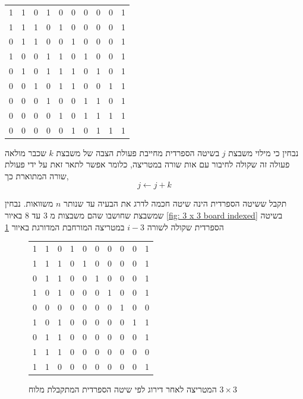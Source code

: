 \documentclass[12pt,twoside]{article}
\begin{document}
\begin{center}
    \begin{tabular}{|ccccccccc|c|}
        \hline
        1& 1& 0& 1& 0& 0& 0& 0& 0& 1 \\
        1& 1& 1& 0& 1& 0& 0& 0& 0& 1 \\
        0& 1& 1& 0& 0& 1& 0& 0& 0& 1 \\
        1& 0& 0& 1& 1& 0& 1& 0& 0& 1 \\
        0& 1& 0& 1& 1& 1& 0& 1& 0& 1 \\
        0& 0& 1& 0& 1& 1& 0& 0& 1& 1 \\
        0& 0& 0& 1& 0& 0& 1& 1& 0& 1 \\
        0& 0& 0& 0& 1& 0& 1& 1& 1& 1 \\
        0& 0& 0& 0& 0& 1& 0& 1& 1& 1 \\
        \hline
    \end{tabular}
\end{center}

נבחין כי מילוי משבצת 
$j$
בשיטה הספרדית מחייבת פעולת הצבה של משבצת
$k$
שכבר מולאה פעולה זה שקולה 
לחיבור עם אות שורה במטריצה, כלומר אפשר לתאר זאת על ידי פעולת שורה 
המתוארת כך,
\[ j \leftarrow j + k \]

תקבל ששיטה הספרדית הינה 
שיטה חכמה לדרג את הבעיה
עד שנותר 
$n$
משוואות.
נבחין שמשבצת שחושבו
שהם משבצות 
מ
$3$
עד 
$8$
באיור
\ref{fig: 3 x 3 board indexed}
בשיטה הספרדית
שקולה לשורה 
$i-3$
במטריצה המורחבת המדורגת
באיור
\ref{fig: matrix after spanish}

\begin{figure}
    \caption{המטריצה לאחר דירוג לפי שיטה הספרדית המתקבלת
        מלוח 
        $3 \times 3$}
    \label{fig: matrix after spanish}
    \begin{center}
        \begin{tabular}{|ccccccccc|c|}
            \hline
    1& 1& 0& 1& 0& 0& 0& 0& 0& 1 \\
    1& 1& 1& 0& 1& 0& 0& 0& 0& 1 \\
    0& 1& 1& 0& 0& 1& 0& 0& 0& 1 \\
    1& 0& 1& 0& 0& 0& 1& 0& 0& 1\\
    0& 0& 0& 0& 0& 0& 0& 1& 0& 0\\
    1& 0& 1& 0& 0& 0& 0& 0& 1& 1\\
    0& 1& 1& 0& 0& 0& 0& 0& 0& 1\\
    1& 1& 1& 0& 0& 0& 0& 0& 0& 0\\
    1& 1& 0& 0& 0& 0& 0& 0& 0& 1\\
            \hline
        \end{tabular}
    \end{center}
\end{figure}
\end{document}
